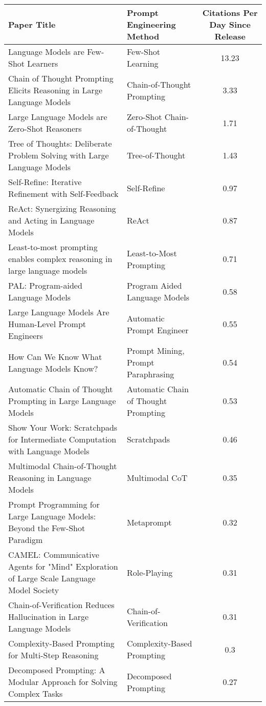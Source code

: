 \begin{tabular}{llc}
\toprule
Paper Title & Prompt Engineering Method & Citations Per Day Since Release \\
\midrule
Language Models are Few-Shot Learners & Few-Shot Learning & 13.23 \\
Chain of Thought Prompting Elicits Reasoning in Large Language Models & Chain-of-Thought Prompting & 3.33 \\
Large Language Models are Zero-Shot Reasoners & Zero-Shot Chain-of-Thought & 1.71 \\
Tree of Thoughts: Deliberate Problem Solving with Large Language Models & Tree-of-Thought & 1.43 \\
Self-Refine: Iterative Refinement with Self-Feedback & Self-Refine & 0.97 \\
ReAct: Synergizing Reasoning and Acting in Language Models & ReAct & 0.87 \\
Least-to-most prompting enables complex reasoning in large language models & Least-to-Most Prompting & 0.71 \\
PAL: Program-aided Language Models & Program Aided Language Models & 0.58 \\
Large Language Models Are Human-Level Prompt Engineers & Automatic Prompt Engineer & 0.55 \\
How Can We Know What Language Models Know? & Prompt Mining, Prompt Paraphrasing & 0.54 \\
Automatic Chain of Thought Prompting in Large Language Models & Automatic Chain of Thought Prompting & 0.53 \\
Show Your Work: Scratchpads for Intermediate Computation with Language Models & Scratchpads & 0.46 \\
Multimodal Chain-of-Thought Reasoning in Language Models & Multimodal CoT & 0.35 \\
Prompt Programming for Large Language Models: Beyond the Few-Shot Paradigm & Metaprompt & 0.32 \\
CAMEL: Communicative Agents for "Mind" Exploration of Large Scale Language Model Society & Role-Playing & 0.31 \\
Chain-of-Verification Reduces Hallucination in Large Language Models & Chain-of-Verification & 0.31 \\
Complexity-Based Prompting for Multi-Step Reasoning & Complexity-Based Prompting & 0.3 \\
Decomposed Prompting: A Modular Approach for Solving Complex Tasks & Decomposed Prompting & 0.27 \\

\end{tabular}
